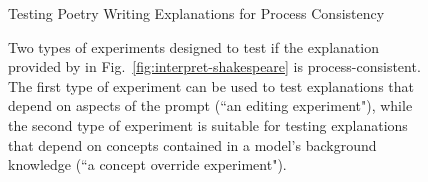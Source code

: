 \begin{figure}[H]
\begin{AIbox}{Testing Poetry Writing Explanations for Process Consistency}




\end{AIbox}
	\caption{Two types of experiments designed to test if the explanation provided by {\DV} in Fig.~\ref{fig:interpret-shakespeare} is process-consistent. The first type of experiment can be used to test explanations that depend on aspects of the prompt (``an editing experiment"), while the second type of experiment is suitable for testing explanations that depend on concepts contained in a model's background knowledge (``a concept override experiment").}
	\label{fig:interpret-shakespeare-tests}
\end{figure}


